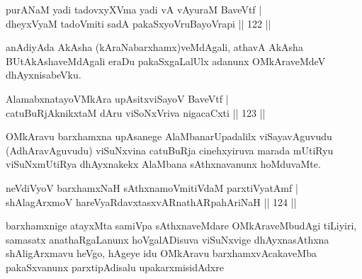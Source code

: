 \begin{shl}
purANaM yadi tadovxyXVma yadi vA vAyuraM BaveVtf  | \\
dheyxVyaM tadoVmiti sadA pakaSxyoVruBayoVrapi \hfill||  122 ||  
\end{shl}

\begin{artha}
anAdiyAda AkAsha (kAraNabarxhamx)veMdAgali, athavA AkAsha BUtAkAshaveMdAgali eraDu pakaSxgaLalUlx adanunx OMkAraveMdeV dhAyxnisabeVku.
\end{artha}

\begin{shl}
AlamabxnatayoVMkAra upAsitxviSayoV BaveVtf  | \\
catuBuRjAknikxtaM dAru viSoNxVriva nigacaCxti \hfill||  123 ||  
\end{shl}

\begin{artha}
OMkAravu barxhamxna upAsanege AlaMbanarUpadalilx viSayavAguvudu (AdhAravAguvudu) viSuNxvina catuBuRja cinehxyiruva marada mUtiRyu viSuNxmUtiRya dhAyxnakekx AlaMbana sAthxnavanunx hoMduvaMte.
\end{artha}


\begin{shl}
neVdiVyoV barxhamxNaH sAthxnamoVmitiVdaM parxtiVyatAmf  | \\
shAlagArxmoV hareVyaRdavxtasxvARnathARpahAriNaH \hfill||  124 ||  
\end{shl}

\begin{artha}
barxhamxnige atayxMta samiVpa sAthxnaveMdare OMkAraveMbudAgi tiLiyiri, samasatx anathaRgaLanunx hoVgalADisuva viSuNxvige dhAyxnasAthxna shAligArxmavu heVgo, hAgeye idu OMkAravu barxhamxvAcakaveMba pakaSxvanunx parxtipAdisalu upakarxmisidAdxre \mdash 
\end{artha}


